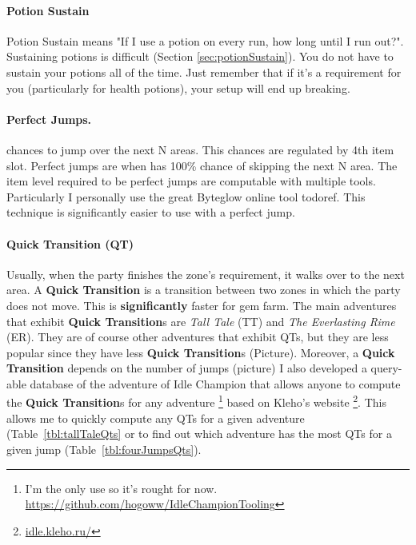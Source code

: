 \documentclass{article}
\begin{document}
\paragraph{Potion Sustain}

Potion Sustain means "If I use a potion on every run, how long until I run out?".
Sustaining potions is difficult (Section \ref{sec:potionSustain}).
You do not have to sustain your potions all of the time.
Just remember that if it's a requirement for you (particularly for health potions), your setup will end up breaking.


\paragraph{Perfect Jumps.}

\briv chances to jump over the next N areas.
This chances are regulated by \briv 4th item slot.
Perfect jumps are when \briv has 100\% chance of skipping the next N area.
The item level required to be perfect jumps are computable with multiple tools.
Particularly I personally use the great Byteglow online tool todoref.
This technique is significantly easier to use with a perfect jump. 

\paragraph{Quick Transition (QT)}

Usually, when the party finishes the zone's requirement, it walks over to the next area.
A \textbf{Quick Transition} is a transition between two zones in which the party does not move.
This is \textbf{significantly} faster for gem farm.
The main adventures that exhibit  \textbf{Quick Transition}s are \textit{Tall Tale} (TT) and \textit{The Everlasting Rime} (ER).
They are of course other adventures that exhibit QTs, but they are less popular since they have less \textbf{Quick Transition}s (Picture).
Moreover, a \textbf{Quick Transition} depends on the number of jumps (picture)
I also developed a query-able database of the adventure of Idle Champion that allows anyone to compute the \textbf{Quick Transition}s for any adventure \footnote{I'm the only use so it's rought for now. \url{https://github.com/hogoww/IdleChampionTooling}} based on Kleho's website \footnote{\url{idle.kleho.ru/}}.
This allows me to quickly compute any QTs for a given adventure (Table~\ref{tbl:tallTaleQts} or to find out which adventure has the most QTs for a given jump (Table~\ref{tbl:fourJumpsQts}).
\end{document}
